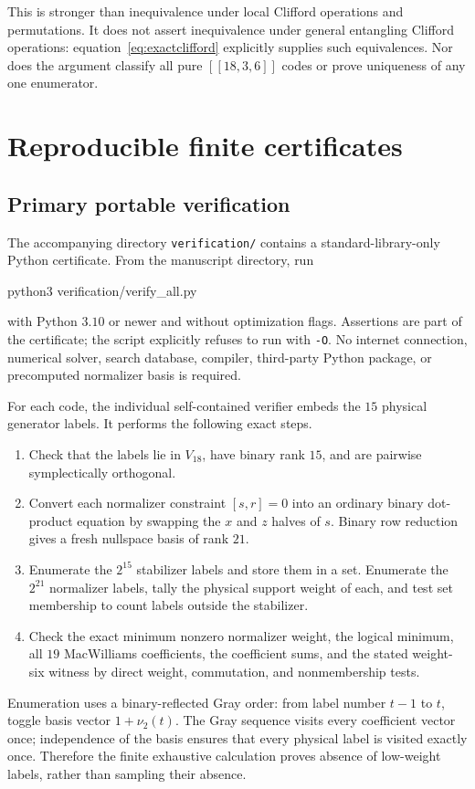 \documentclass[11pt,a4paper]{article}
\begin{document}
This is stronger than inequivalence under local Clifford operations and permutations. It does not assert inequivalence under general entangling Clifford operations: equation~\eqref{eq:exactclifford} explicitly supplies such equivalences. Nor does the argument classify all pure $[[18,3,6]]$ codes or prove uniqueness of any one enumerator.

\section{Reproducible finite certificates}\label{sec:reproducibility}
\subsection{Primary portable verification}
The accompanying directory \texttt{verification/} contains a standard-library-only Python certificate. From the manuscript directory, run
\begin{center}\ttfamily python3 verification/verify\_all.py\end{center}
with Python $3.10$ or newer and without optimization flags. Assertions are part of the certificate; the script explicitly refuses to run with \texttt{-O}. No internet connection, numerical solver, search database, compiler, third-party Python package, or precomputed normalizer basis is required.

For each code, the individual self-contained verifier embeds the $15$ physical generator labels. It performs the following exact steps.
\begin{enumerate}
\item Check that the labels lie in $V_{18}$, have binary rank $15$, and are pairwise symplectically orthogonal.
\item Convert each normalizer constraint $[s,r]=0$ into an ordinary binary dot-product equation by swapping the $x$ and $z$ halves of $s$. Binary row reduction gives a fresh nullspace basis of rank $21$.
\item Enumerate the $2^{15}$ stabilizer labels and store them in a set. Enumerate the $2^{21}$ normalizer labels, tally the physical support weight of each, and test set membership to count labels outside the stabilizer.
\item Check the exact minimum nonzero normalizer weight, the logical minimum, all $19$ MacWilliams coefficients, the coefficient sums, and the stated weight-six witness by direct weight, commutation, and nonmembership tests.
\end{enumerate}
Enumeration uses a binary-reflected Gray order: from label number $t-1$ to $t$, toggle basis vector $1+\nu_2(t)$. The Gray sequence visits every coefficient vector once; independence of the basis ensures that every physical label is visited exactly once. Therefore the finite exhaustive calculation proves absence of low-weight labels, rather than sampling their absence.
\end{document}
